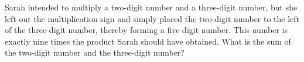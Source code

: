 Sarah intended to multiply a two-digit number and a three-digit number, but she left out the multiplication sign and simply placed the two-digit number to the left of the three-digit number, thereby forming a five-digit number.  This number is exactly nine times the product Sarah should have obtained.  What is the sum of the two-digit number and the three-digit number?